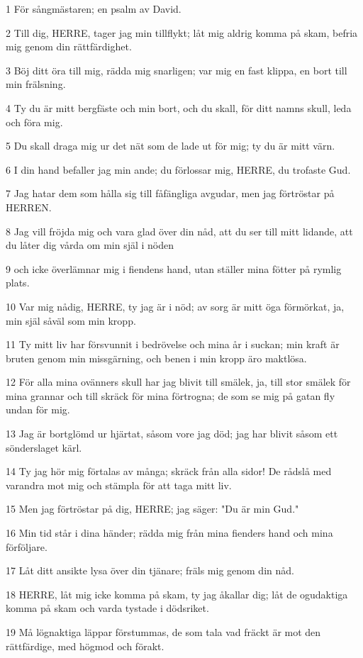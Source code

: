 \par 1 För sångmästaren; en psalm av David.
\par 2 Till dig, HERRE, tager jag min tillflykt; låt mig aldrig komma på skam, befria mig genom din rättfärdighet.
\par 3 Böj ditt öra till mig, rädda mig snarligen; var mig en fast klippa, en bort till min frälsning.
\par 4 Ty du är mitt bergfäste och min bort, och du skall, för ditt namns skull, leda och föra mig.
\par 5 Du skall draga mig ur det nät som de lade ut för mig; ty du är mitt värn.
\par 6 I din hand befaller jag min ande; du förlossar mig, HERRE, du trofaste Gud.
\par 7 Jag hatar dem som hålla sig till fåfängliga avgudar, men jag förtröstar på HERREN.
\par 8 Jag vill fröjda mig och vara glad över din nåd, att du ser till mitt lidande, att du låter dig vårda om min själ i nöden
\par 9 och icke överlämnar mig i fiendens hand, utan ställer mina fötter på rymlig plats.
\par 10 Var mig nådig, HERRE, ty jag är i nöd; av sorg är mitt öga förmörkat, ja, min själ såväl som min kropp.
\par 11 Ty mitt liv har försvunnit i bedrövelse och mina år i suckan; min kraft är bruten genom min missgärning, och benen i min kropp äro maktlösa.
\par 12 För alla mina ovänners skull har jag blivit till smälek, ja, till stor smälek för mina grannar och till skräck för mina förtrogna; de som se mig på gatan fly undan för mig.
\par 13 Jag är bortglömd ur hjärtat, såsom vore jag död; jag har blivit såsom ett sönderslaget kärl.
\par 14 Ty jag hör mig förtalas av många; skräck från alla sidor! De rådslå med varandra mot mig och stämpla för att taga mitt liv.
\par 15 Men jag förtröstar på dig, HERRE; jag säger: "Du är min Gud."
\par 16 Min tid står i dina händer; rädda mig från mina fienders hand och mina förföljare.
\par 17 Låt ditt ansikte lysa över din tjänare; fräls mig genom din nåd.
\par 18 HERRE, låt mig icke komma på skam, ty jag åkallar dig; låt de ogudaktiga komma på skam och varda tystade i dödsriket.
\par 19 Må lögnaktiga läppar förstummas, de som tala vad fräckt är mot den rättfärdige, med högmod och förakt.
